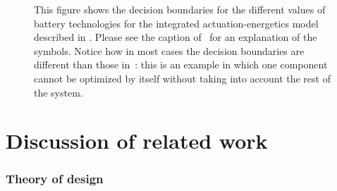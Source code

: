 \documentclass[twocolumn,english]{IEEEtran}
\theoremstyle{definition}
\theoremstyle{plain}
\theoremstyle{definition}
\theoremstyle{remark}
\theoremstyle{definition}
\theoremstyle{plain}
\theoremstyle{plain}
\begin{document}
\begin{figure}
\begin{centering}
{\begin{centering}
\par\end{centering}
}
\par\end{centering}
\begin{centering}
\par\end{centering}
\caption{\label{fig:drone_choice}This figure shows the decision boundaries
for the different values of battery technologies for the integrated
actuation-energetics model described in . Please
see the caption of~ for an explanation of the
symbols. Notice how in most cases the decision boundaries are different
than those in~: this is an example in which
one component cannot be optimized by itself without taking into account
the rest of the system.}
\end{figure}




\section{Discussion of related work\label{sec:Discussion-of-related}}

\subsubsection*{Theory of design}
\end{document}
